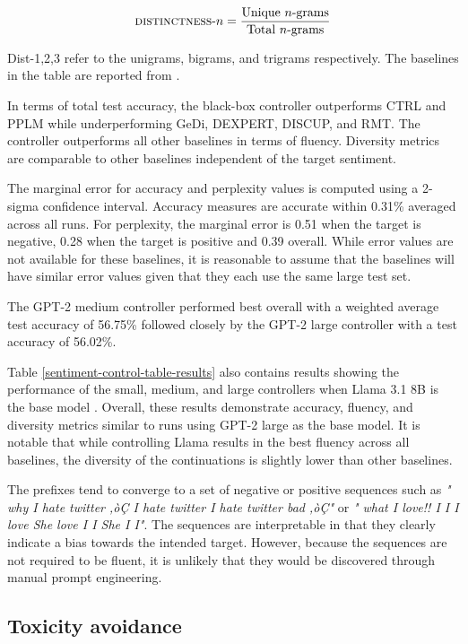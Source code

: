 \documentclass[phd,electronic,oneside,twosidetoc,letterpaper,chaptercenter,parttop,lof]{byumsphd}
\begin{document}
\begin{equation}
    \textrm{\textsc{distinctness}-\(n\)} = \frac{\textrm{Unique \(n\)-grams}}{\textrm{Total \(n\)-grams}}
\end{equation}

Dist-1,2,3 refer to the unigrams, bigrams, and trigrams respectively.
The baselines in the table are reported from \citet{zhang2023rmt}.

In terms of total test accuracy, the black-box controller outperforms CTRL and PPLM while underperforming GeDi, DEXPERT, DISCUP, and RMT. 
The controller outperforms all other baselines in terms of fluency.
Diversity metrics are comparable to other baselines independent of the target sentiment.

The marginal error for accuracy and perplexity values is computed using a 2-sigma confidence interval.
Accuracy measures are accurate within 0.31\% averaged across all runs.
For perplexity, the marginal error is 0.51 when the target is negative, 0.28 when the target is positive and 0.39 overall.
While error values are not available for these baselines, it is reasonable to assume that the baselines will have similar error values given that they each use the same large test set.

The GPT-2 medium controller performed best overall with a weighted average test accuracy of 56.75\% followed closely by the GPT-2 large controller with a test accuracy of 56.02\%.

Table \ref{sentiment-control-table-results} also contains results showing the performance of the small, medium, and large controllers when Llama 3.1 8B is the base model \cite{meta2024llama3}.
Overall, these results demonstrate accuracy, fluency, and diversity metrics similar to runs using GPT-2 large as the base model.
It is notable that while controlling Llama results in the best fluency across all baselines, the diversity of the continuations is slightly lower than other baselines.

The prefixes tend to converge to a set of negative or positive sequences such as \textit{" why I hate twitter ‚òÇ I hate twitter I hate twitter bad ‚òÇ"} or \textit{" what I love!! I I I love She love I I She I I"}.
The sequences are interpretable in that they clearly indicate a bias towards the intended target.
However, because the sequences are not required to be fluent, it is unlikely that they would be discovered through manual prompt engineering.

\subsection{Toxicity avoidance}
\end{document}
